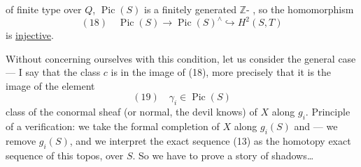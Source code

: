 of finite type over $Q$, $\operatorname{Pic}(S)$ is a finitely generated $\mathbb Z$- , so the homomorphism
\[
(18)\quad \operatorname{Pic}(S)\longrightarrow\operatorname{Pic}(S)^\wedge\hookrightarrow H^2(S,T)
\]
is \uline{injective}.

Without concerning ourselves with this condition,  let us consider the general case --- I say that the class  $c$  is in the image of (18), more precisely that it is the image of the element
\[
(19)\quad \gamma_i\in\operatorname{Pic}(S)
\]
class of the conormal sheaf (or normal, the devil knows) of $X$ along $g_i$. Principle of a verification: we take the formal completion of $X$ along $g_i(S)$ and   --- we remove $g_i(S)$, and we interpret the exact sequence (13) as the homotopy exact sequence of this   topos, over  $S$. So we have to prove a story of shadows\dots
{}
